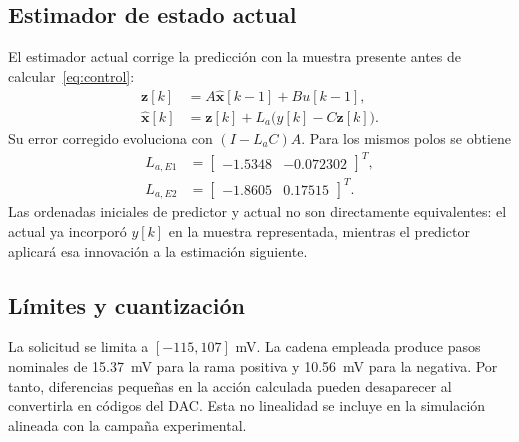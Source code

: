 \subsection{Estimador de estado actual}
El estimador actual corrige la predicción con la muestra presente antes de
calcular~\eqref{eq:control}:
\begin{align}
\mathbf z[k]&=A\widehat{\mathbf{x}}[k-1]+Bu[k-1],\\
\widehat{\mathbf{x}}[k]&=\mathbf z[k]+L_a\bigl(y[k]-C\mathbf z[k]\bigr).
\end{align}
Su error corregido evoluciona con $(I-L_aC)A$. Para los mismos polos se obtiene
\begin{align}
L_{a,E1}&=\begin{bmatrix}-1.5348&-0.072302\end{bmatrix}^{T},\\
L_{a,E2}&=\begin{bmatrix}-1.8605&0.17515\end{bmatrix}^{T}.
\end{align}
Las ordenadas iniciales de predictor y actual no son directamente equivalentes:
el actual ya incorporó $y[k]$ en la muestra representada, mientras el predictor
aplicará esa innovación a la estimación siguiente.

\subsection{Límites y cuantización}
La solicitud se limita a $[-115,107]$ mV. La cadena empleada produce pasos
nominales de \SI{15.37}{\milli\volt} para la rama positiva y
\SI{10.56}{\milli\volt} para la negativa. Por tanto, diferencias pequeñas en
la acción calculada pueden desaparecer al convertirla en códigos del DAC. Esta
no linealidad se incluye en la simulación alineada con la campaña experimental.
